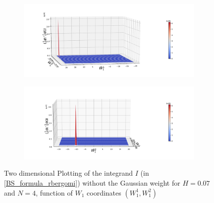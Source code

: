\documentclass[11pt]{article}
\begin{document}
	



\begin{figure}[h!]
	\centering
	\begin{subfigure}{.4\textwidth}
		\centering
			\includegraphics[width=1\linewidth]{./figures/integrand_plotting_rBergomi/2D_plots/N_4/integrand_without_density/H_007/Bergomi_integrand_contours_K_1_H_007_W1_1_2_N_4_without_weights_2_80}
		\caption{}
		\label{fig:sub3}
	\end{subfigure}%
	\begin{subfigure}{.4\textwidth}
		\centering
		\includegraphics[width=1\linewidth]{./figures/integrand_plotting_rBergomi/2D_plots/N_4/integrand_without_density/H_007/Bergomi_integrand_contours_K_1_H_007_W1_1_2_N_4_without_weights_2_0}
		\caption{}
		\label{fig:sub4}
	\end{subfigure}
	
	
	
	\caption{Two dimensional Plotting of the integrand $I$ (in \eqref{BS_formula_rbergomi}) without the Gaussian weight  for $H=0.07$ and $N=4$, function of $W_1$ coordinates $(W_1^1,W^2_1)$}
	\label{fig:Two dimensional Plotting of the integrand $I$_W12_view}
\end{figure}
\end{document}
